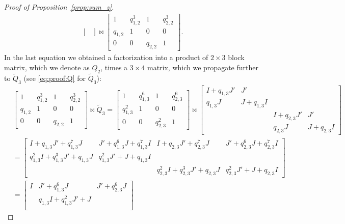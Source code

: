 \documentclass[a4paper]{article}
\begin{document}
\begin{proof}[Proof of Proposition~\ref{prop:sum_z}]
\[\begin{split}
\begin{bmatrix}
    \end{bmatrix}
    \Join 
    \begin{bmatrix}
        1 & q_{1,2}^3 & 1 & q_{2,2}^3\\
        q_{1,2}& 1 & 0 & 0 \\
        0 & 0 & q_{2,2} & 1 
    \end{bmatrix}.
\end{split} 
\]
In the last equation we obtained a factorization into a product of $2\times 3$ block matrix, which we denote as $Q_2$, times a $3\times 4$ matrix, which we propagate further to ${\widetilde Q}_3$ (see \eqref{eq:proof:Q} for ${\widetilde Q}_3$):
\[
\begin{split}
    &\begin{bmatrix}
        1 & q_{1,2}^3 & 1 & q_{2,2}^3 \\
        q_{1,2}& 1 & 0 & 0 \\
        0 & 0 & q_{2,2} & 1 
    \end{bmatrix}
    \Join
    {\widetilde Q}_3 
    =
    \begin{bmatrix}
        1 & q_{1,3}^6 & 1 & q_{2,3}^6\\
        q_{1,3}^2& 1 & 0 & 0 \\
        0 & 0 & q_{2,3}^2 & 1 
    \end{bmatrix}
    \Join
    \begin{bmatrix}
        I + q_{1,3} J' & J' \\
        q_{1,3} J & J + q_{1,3} I \\
        & & I + q_{2,3} J' & J' \\
        & & q_{2,3} J & J + q_{2,3} I
    \end{bmatrix}
    \\
    & = 
    \begin{bmatrix}
        I + q_{1,3} J' + q_{1,3}^7 J & J' + q_{1,3}^6 J + q_{1,3}^7 I & I + q_{2,3} J' + q_{2,3}^7 J & J' + q_{2,3}^6 J + q_{2,3}^7 I \\
        q_{1,3}^2 I + q_{1,3}^3 J' + q_{1,3} J  & q_{1,3}^2 J' + J + q_{1,3} I & & \\
        & & q_{2,3}^2 I + q_{2,3}^3 J' + q_{2,3} J  & q_{2,3}^2 J' + J + q_{2,3} I 
    \end{bmatrix}
    \\
    & = 
    \begin{bmatrix}
        I & J' + q_{1,3}^6 J & J' + q_{2,3}^6 J \\
        & q_{1,3} I + q_{1,3}^2 J' + J \\

\end{bmatrix}
\end{split}\]
\end{proof}
\end{document}
